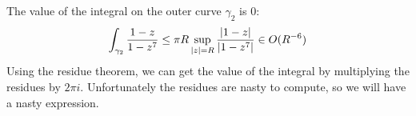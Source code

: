 \documentclass{homework}
\begin{document}
\begin{solution}
                                                                                                       The value of the integral on the outer curve $\gamma_2$ is 0:
                                                                                                       \[
                                                                                                       \int_{\gamma_2} \frac{1-z}{1-z^7} \leq \pi R \sup_{|z|=R} \frac{\left|1-z\right|}{\left|1-z^7\right|} \in O(R^{-6}) 
                                                                                                       \]
                                                                                                       Using the residue theorem, we can get the value of the integral by multiplying the residues by $2\pi i$. Unfortunately the residues are nasty to compute, so we will have a nasty expression.


\end{solution}
\end{document}
